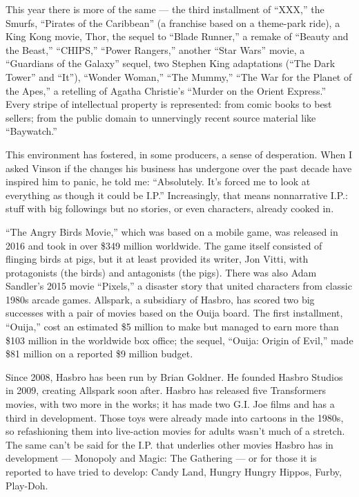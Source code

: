 This year there is more of the same --- the third installment of
``XXX,'' the Smurfs, ``Pirates of the Caribbean'' (a franchise based on
a theme-park ride), a King Kong movie, Thor, the sequel to ``Blade
Runner,'' a remake of ``Beauty and the Beast,'' ``CHIPS,'' ``Power
Rangers,'' another ``Star Wars'' movie, a ``Guardians of the Galaxy''
sequel, two Stephen King adaptations (``The Dark Tower'' and ``It''),
``Wonder Woman,'' ``The Mummy,'' ``The War for the Planet of the Apes,''
a retelling of Agatha Christie's ``Murder on the Orient Express.'' Every
stripe of intellectual property is represented: from comic books to best
sellers; from the public domain to unnervingly recent source material
like ``Baywatch.''

This environment has fostered, in some producers, a sense of
desperation. When I asked Vinson if the changes his business has
undergone over the past decade have inspired him to panic, he told me:
``Absolutely. It's forced me to look at everything as though it could be
I.P.'' Increasingly, that means non­narrative I.P.: stuff with big
followings but no stories, or even characters, already cooked in.

``The Angry Birds Movie,'' which was based on a mobile game, was
released in 2016 and took in over \$349 million worldwide. The game
itself consisted of flinging birds at pigs, but it at least provided its
writer, Jon Vitti, with protagonists (the birds) and antagonists (the
pigs). There was also Adam Sandler's 2015 movie ``Pixels,'' a disaster
story that united characters from classic 1980s arcade games. Allspark,
a subsidiary of Hasbro, has scored two big successes with a pair of
movies based on the Ouija board. The first installment, ``Ouija,'' cost
an estimated \$5 million to make but managed to earn more than \$103
million in the worldwide box office; the sequel, ``Ouija: Origin of
Evil,'' made \$81 million on a reported \$9 million budget.

Since 2008, Hasbro has been run by Brian Goldner. He founded Hasbro
Studios in 2009, creating Allspark soon after. Hasbro has released five
Transformers movies, with two more in the works; it has made two G.I.
Joe films and has a third in development. Those toys were already made
into cartoons in the 1980s, so refashioning them into live-­action
movies for adults wasn't much of a stretch. The same can't be said for
the I.P. that underlies other movies Hasbro has in development ---
Monopoly and Magic: The Gathering --- or for those it is reported to
have tried to develop: Candy Land, Hungry Hungry Hippos, Furby,
Play-Doh.


